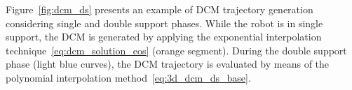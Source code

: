 Figure~\ref{fig:dcm_ds} presents an example of DCM trajectory generation considering single and double support phases. While the robot is in single support, the DCM is generated by applying the exponential interpolation technique~\eqref{eq:dcm_solution_eos} (orange segment).
During the double support phase (light blue curves), the DCM trajectory is evaluated by means of the polynomial interpolation method~\eqref{eq:3d_dcm_ds_base}.

